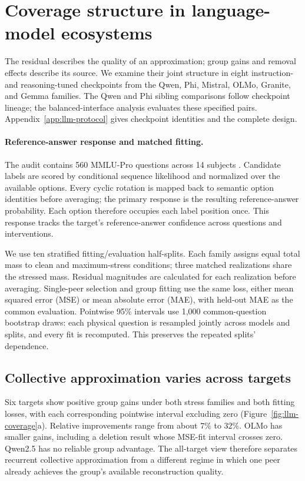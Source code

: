 \section{Coverage structure in language-model ecosystems}
\label{sec:llm-exp}

The residual describes the quality of an approximation; group gains and removal effects describe its source. We examine their joint structure in eight instruction- and reasoning-tuned checkpoints from the Qwen, Phi, Mistral, OLMo, Granite, and Gemma families. The Qwen and Phi sibling comparisons follow checkpoint lineage; the balanced-interface analysis evaluates these specified pairs. Appendix~\ref{app:llm-protocol} gives checkpoint identities and the complete design.

\paragraph{Reference-answer response and matched fitting.}
The audit contains 560 MMLU-Pro questions across 14 subjects \citep{wang2024mmlupro}. Candidate labels are scored by conditional sequence likelihood and normalized over the available options. Every cyclic rotation is mapped back to semantic option identities before averaging; the primary response is the resulting reference-answer probability. Each option therefore occupies each label position once. This response tracks the target's reference-answer confidence across questions and interventions.

We use ten stratified fitting/evaluation half-splits. Each family assigns equal total mass to clean and maximum-stress conditions; three matched realizations share the stressed mass. Residual magnitudes are calculated for each realization before averaging. Single-peer selection and group fitting use the same loss, either mean squared error (MSE) or mean absolute error (MAE), with held-out MAE as the common evaluation. Pointwise 95\% intervals use 1,000 common-question bootstrap draws: each physical question is resampled jointly across models and splits, and every fit is recomputed. This preserves the repeated splits' dependence.

\subsection{Collective approximation varies across targets}
Six targets show positive group gains under both stress families and both fitting losses, with each corresponding pointwise interval excluding zero (Figure~\ref{fig:llm-coverage}a). Relative improvements range from about $7\%$ to $32\%$. OLMo has smaller gains, including a deletion result whose MSE-fit interval crosses zero. Qwen2.5 has no reliable group advantage. The all-target view therefore separates recurrent collective approximation from a different regime in which one peer already achieves the group's available reconstruction quality.

